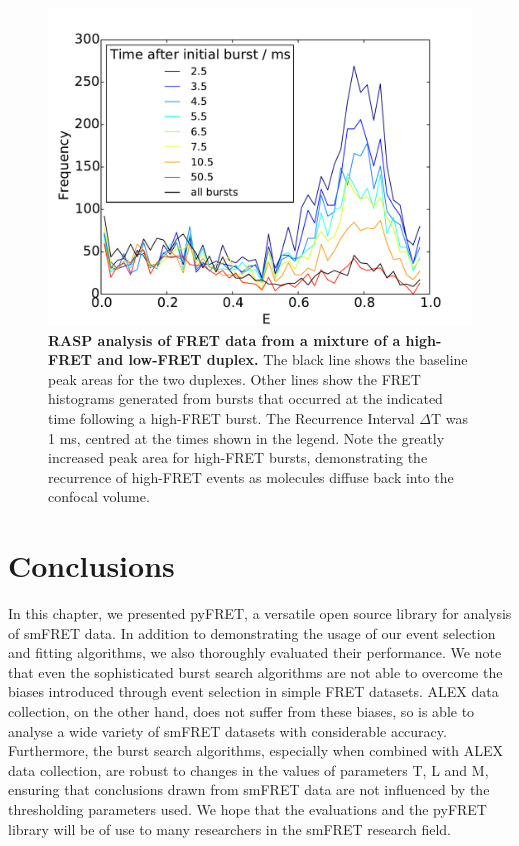 \begin{figure}[!ht]
   \begin{center}
      \includegraphics*[clip=true, width=6in]{pyFRET/RASP_performance.pdf}
      \caption{{\bf RASP analysis of FRET data from a mixture of a high-FRET and low-FRET duplex.} The black line shows the baseline peak areas for the two duplexes. Other lines show the FRET histograms generated from bursts that occurred at the indicated time following a high-FRET burst. The Recurrence Interval $\Delta$T was 1 ms, centred at the times shown in the legend. Note the greatly increased peak area for high-FRET bursts, demonstrating the recurrence of high-FRET events as molecules diffuse back into the confocal volume.}
      \label{fig:fig9_RASP}
   \end{center}
\end{figure}

\section{Conclusions}
In this chapter, we presented pyFRET, a versatile open source library for analysis of smFRET data. In addition to demonstrating the usage of our event selection and fitting algorithms, we also thoroughly evaluated their performance. We note that even the sophisticated burst search algorithms are not able to overcome the biases introduced through event selection in simple FRET datasets. ALEX data collection, on the other hand, does not suffer from these biases, so is able to analyse a wide variety of smFRET datasets with considerable accuracy. Furthermore, the burst search algorithms, especially when combined with ALEX data collection, are robust to changes in the values of parameters T, L and M, ensuring that conclusions drawn from smFRET data are not influenced by the thresholding parameters used. We hope that the evaluations and the pyFRET library will be of use to many researchers in the smFRET research field. 
 
